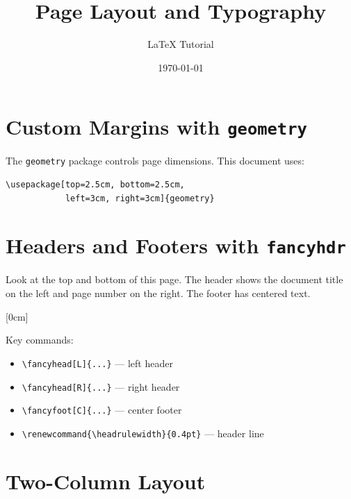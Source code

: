 \documentclass[12pt, a4paper]{article}
\title{Page Layout and Typography}
\author{LaTeX Tutorial}
\date{\today}
\renewcommand{\headrulewidth}{0.4pt}    %
\begin{document}
\maketitle
\thispagestyle{fancy}  %

\section{Custom Margins with \texttt{geometry}}

The \texttt{geometry} package controls page dimensions. This document uses:

\begin{verbatim}
\usepackage[top=2.5cm, bottom=2.5cm,
            left=3cm, right=3cm]{geometry}
\end{verbatim}

\lipsum[1]

\section{Headers and Footers with \texttt{fancyhdr}}

Look at the top and bottom of this page. The header shows the document title
on the left and page number on the right. The footer has centered text.

[0cm]

Key commands:
\begin{itemize}
    \item \verb|\fancyhead[L]{...}| --- left header
    \item \verb|\fancyhead[R]{...}| --- right header
    \item \verb|\fancyfoot[C]{...}| --- center footer
    \item \verb|\renewcommand{\headrulewidth}{0.4pt}| --- header line
\end{itemize}

\lipsum[2]

\section{Two-Column Layout}
\end{document}
